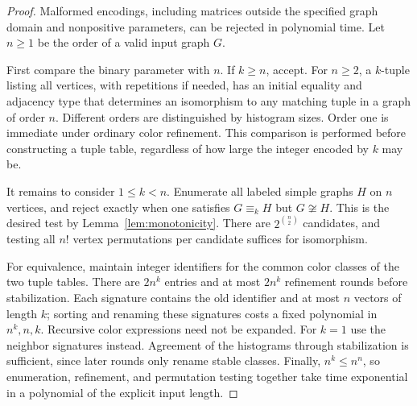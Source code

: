 \begin{proof}
Malformed encodings, including matrices outside the specified graph
domain and nonpositive parameters, can be rejected in polynomial
time. Let $n\ge 1$ be the order of a valid input graph $G$.

First compare the binary parameter with $n$. If $k\ge n$, accept.
For $n\ge 2$, a $k$-tuple listing all vertices, with repetitions if
needed, has an initial equality and adjacency type that determines
an isomorphism to any matching tuple in a graph of order $n$.
Different orders are distinguished by histogram sizes. Order one
is immediate under ordinary color refinement. This comparison is
performed before constructing a tuple table, regardless of how
large the integer encoded by $k$ may be.

It remains to consider $1\le k<n$. Enumerate all labeled simple
graphs $H$ on $n$ vertices, and reject exactly when one satisfies
$G\equiv_k H$ but $G\not\cong H$. This is the desired test by
Lemma~\ref{lem:monotonicity}. There are
$2^{\binom n2}$ candidates, and testing all $n!$ vertex permutations
per candidate suffices for isomorphism.

For equivalence, maintain integer identifiers for the common color
classes of the two tuple tables. There are $2n^k$ entries and at
most $2n^k$ refinement rounds before stabilization. Each signature
contains the old identifier and at most $n$ vectors of length $k$;
sorting and renaming these signatures costs a fixed polynomial in
$n^k,n,k$. Recursive color expressions need not be expanded.
For $k=1$ use the neighbor signatures instead. Agreement of the
histograms through stabilization is sufficient, since later rounds
only rename stable classes. Finally, $n^k\le n^n$, so enumeration,
refinement, and permutation testing together take time exponential
in a polynomial of the explicit input length.
\end{proof}
